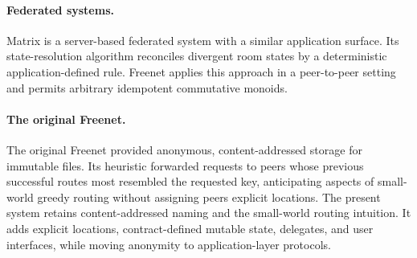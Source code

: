 \paragraph{Federated systems.} Matrix \citep{matrix} is a server-based federated system with a similar application surface. Its state-resolution algorithm reconciles divergent room states by a deterministic application-defined rule. Freenet applies this approach in a peer-to-peer setting and permits arbitrary idempotent commutative monoids.

\paragraph{The original Freenet.} The original Freenet \citep{clarke2001freenet} provided anonymous, content-addressed storage for immutable files. Its heuristic forwarded requests to peers whose previous successful routes most resembled the requested key, anticipating aspects of small-world greedy routing without assigning peers explicit locations. The present system retains content-addressed naming and the small-world routing intuition. It adds explicit locations, contract-defined mutable state, delegates, and user interfaces, while moving anonymity to application-layer protocols.
